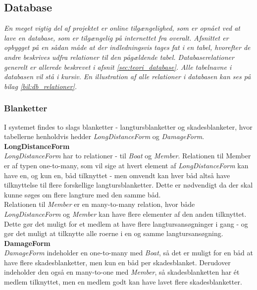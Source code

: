\subsection{Database}
\textit{En meget vigtig del af projektet er online tilgængelighed, som er opnået ved at lave en database, som er tilgængelig på internettet fra overalt. Afsnittet er opbygget på en sådan måde at der indledningsvis tages fat i en tabel, hvorefter de andre beskrives udfra relationer til den pågældende tabel. Databaserelationer generelt er allerede beskrevet i afsnit \ref{sec:teori_database}. Alle tabelnavne i databasen vil stå i kursiv. En illustration af alle relationer i databasen kan ses på bilag \ref{bil:db_relationer}.}

\subsubsection*{Blanketter}
I systemet findes to slags blanketter - langtursblanketter og skadesblanketer, hvor tabellerne henholdvis hedder \textit{LongDistanceForm} og \textit{DamageForm}.\\

\textbf{LongDistanceForm}\\
\textit{LongDistanceForm} har to relationer - til \textit{Boat} og \textit{Member}. Relationen til Member er af typen one-to-many, som vil sige at hvert element af \textit{LongDistanceForm} kan have en, og kun en, båd tilknyttet - men omvendt kan hver båd altså have tilknyttelse til flere forskellige langtursblanketter. Dette er nødvendigt da der skal kunne søges om flere langture med den samme båd.\\

Relationen til \textit{Member} er en many-to-many relation, hvor både \textit{LongDistanceForm} og \textit{Member} kan have flere elementer af den anden tilknyttet. Dette gør det muligt for et medlem at have flere langtursansøgninger i gang - og gør det muligt at tilknytte alle roerne i en og samme langtursansøgning.\\

\textbf{DamageForm}\\
\textit{DamageForm} indeholder en one-to-many med \textit{Boat}, så det er muligt for en båd at have flere skadesblanketter, men kun en båd per skadesblanket. Derudover indeholder den også en many-to-one med \textit{Member}, så skadesblanketten har ét medlem tilknyttet, men en medlem godt kan have lavet flere skadesblanketter.

